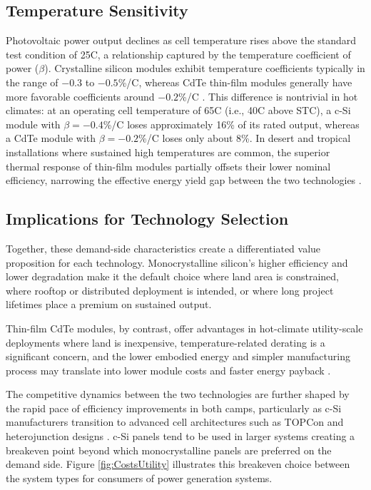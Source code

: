 \documentclass{article}
\begin{document}
\subsection{Temperature Sensitivity}
 
Photovoltaic power output declines as cell temperature rises above the standard test condition of 25\textdegree{}C, a relationship captured by the temperature coefficient of power ($\beta$). Crystalline silicon modules exhibit temperature coefficients typically in the range of $-0.3$ to $-0.5$\%/\textdegree{}C, whereas CdTe thin-film modules generally have more favorable coefficients around $-0.2$\%/\textdegree{}C \citep{Skoplaki2009}. This difference is nontrivial in hot climates: at an operating cell temperature of 65\textdegree{}C (i.e., 40\textdegree{}C above STC), a c-Si module with $\beta = -0.4$\%/\textdegree{}C loses approximately 16\% of its rated output, whereas a CdTe module with $\beta = -0.2$\%/\textdegree{}C loses only about 8\%. In desert and tropical installations where sustained high temperatures are common, the superior thermal response of thin-film modules partially offsets their lower nominal efficiency, narrowing the effective energy yield gap between the two technologies \citep{Alqahtani2022}.
 
\subsection{Implications for Technology Selection}
 
Together, these demand-side characteristics create a differentiated value proposition for each technology. Monocrystalline silicon's higher efficiency and lower degradation make it the default choice where land area is constrained, where rooftop or distributed deployment is intended, or where long project lifetimes place a premium on sustained output. 

Thin-film CdTe modules, by contrast, offer advantages in hot-climate utility-scale deployments where land is inexpensive, temperature-related derating is a significant concern, and the lower embodied energy and simpler manufacturing process may translate into lower module costs and faster energy payback \citep{Fthenakis2011, NREL_CdTe2025}.

The competitive dynamics between the two technologies are further shaped by the rapid pace of efficiency improvements in both camps, particularly as c-Si manufacturers transition to advanced cell architectures such as TOPCon and heterojunction designs \citep{ITRPV2024}. c-Si panels tend to be used in larger systems creating a breakeven point beyond which monocrystalline panels are preferred on the demand side. Figure \ref{fig:CostsUtility} illustrates this breakeven choice between the system types for consumers of power generation systems.
\end{document}
